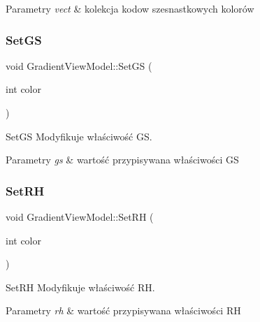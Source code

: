 \begin{DoxyParams}{Parametry}
{\em vect} & kolekcja kodow szesnastkowych kolorów \\
\hline
\end{DoxyParams}
\mbox{\label{class_gradient_view_model_a2b2cd55164016c051b0784396b51c0eb}} 
\subsubsection{\texorpdfstring{Set\+GS}{SetGS}}
{\footnotesize\ttfamily void Gradient\+View\+Model\+::\+Set\+GS (\begin{DoxyParamCaption}\item[{int}]{color }\end{DoxyParamCaption})\hspace{0.3cm}{\ttfamily [slot]}}



Set\+GS Modyfikuje właściwość GS. 


\begin{DoxyParams}{Parametry}
{\em gs} & wartość przypisywana właściwości GS \\
\hline
\end{DoxyParams}
\mbox{\label{class_gradient_view_model_a1a5a60c3fb1224b70203f811747043c1}} 
\subsubsection{\texorpdfstring{Set\+RH}{SetRH}}
{\footnotesize\ttfamily void Gradient\+View\+Model\+::\+Set\+RH (\begin{DoxyParamCaption}\item[{int}]{color }\end{DoxyParamCaption})\hspace{0.3cm}{\ttfamily [slot]}}



Set\+RH Modyfikuje właściwość RH. 


\begin{DoxyParams}{Parametry}
{\em rh} & wartość przypisywana właściwości RH \\
\hline
\end{DoxyParams}
\mbox{\label{class_gradient_view_model_a17f428fa2bb8885ecf5e712e1d35c7a8}} 
